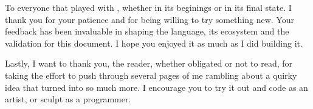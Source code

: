 To everyone that played with \sculpt, whether in its beginings or in its final state. I thank you for your patience and for being willing to try something new. Your feedback has been invaluable in shaping the language, its ecosystem and the validation for this document.
I hope you enjoyed it as much as I did building it.

Lastly, I want to thank you, the reader, whether obligated or not to read, for taking the effort to push through several pages of me rambling about
a quirky idea that turned into so much more. I encourage you to try it out and code as an artist, or sculpt as a programmer.
\endinput

